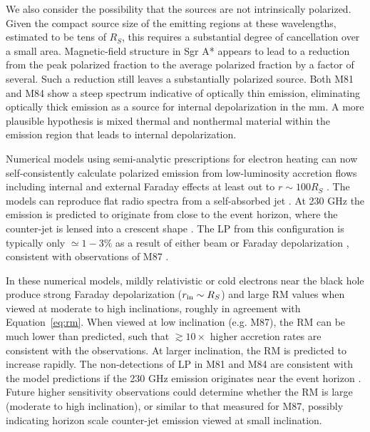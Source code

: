\documentclass[12pt,preprint]{aastex}
\begin{document}
We also consider the possibility that the sources are not intrinsically polarized.  Given
the compact source size of the emitting regions at these wavelengths, estimated to be tens
of $R_S$, this requires a substantial degree of cancellation over a small area.  
Magnetic-field
structure in Sgr A* appears to lead to a reduction from the peak polarized fraction 
to the average polarized fraction by a factor of several.  Such a reduction still 
leaves a substantially polarized source.  Both M81 and M84 show a steep spectrum indicative
of optically thin emission, eliminating optically thick emission as a source for
internal depolarization in the mm.  A more plausible hypothesis is 
mixed thermal and nonthermal material within the emission region that leads to 
internal depolarization.

Numerical models using semi-analytic prescriptions for electron heating
\citep{2014A&A...570A...7M,2016A&A...586A..38M,2017MNRAS.467.3604R} can now
self-consistently calculate polarized emission from low-luminosity
accretion flows including internal and external Faraday effects at
least out to $r \sim 100 R_S$ \citep{2016MNRAS.462..115D,2017MNRAS.468.2214M}. The models can reproduce flat
radio spectra from a self-absorbed jet \citep[e.g.,][]{1979ApJ...232...34B,1995A&A...293..665F}. At 230 GHz the emission is predicted to
originate from close to the event horizon, where the counter-jet is
lensed into a crescent shape \citep{2012MNRAS.421.1517D}. The LP from this
configuration is typically only $\simeq 1-3\%$ as a result of either
beam or Faraday depolarization \citep{2017MNRAS.468.2214M}, consistent
with observations of M87 \citep{2014ApJ...783L..33K}.

In these numerical models,
mildly relativistic or cold electrons near the black hole produce strong Faraday
depolarization ($r_{\rm in} \sim R_S$) and large RM
values when viewed at moderate to high inclinations, roughly in
agreement with Equation~\ref{eq:rm}. When viewed at low inclination
(e.g. M87), the RM can be much lower than predicted, such that
$\gtrsim 10\times$ higher accretion rates are consistent with the observations. At
larger inclination, the RM is predicted to increase rapidly. The
non-detections of LP in M81 and M84 are consistent with the
\citet{2017MNRAS.468.2214M} model predictions if the 230 GHz emission
originates near the event horizon \citep[as suggested for M81 by its short variability timescale,][]{
2015ApJ...811L...6B}. Future higher sensitivity observations could
determine whether the RM is large (moderate to high inclination), or
similar to that measured for M87, possibly indicating horizon scale
counter-jet emission viewed at small inclination.
\end{document}
